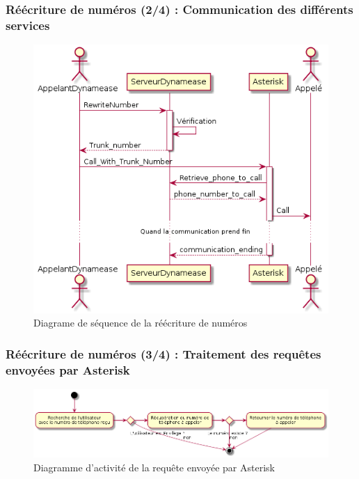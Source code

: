 \begin{frame}
	\frametitle{Réécriture de numéros (2/4) : Communication des différents services}

	\begin{center}
	  \begin{figure}
        \includegraphics[scale=0.30]{images/sequence_rewirte.png}
	   \caption{Diagrame de séquence de la réécriture de numéros}
	  \end{figure}
	\end{center}
\end{frame}

\begin{frame}
	\frametitle{Réécriture de numéros (3/4) : Traitement des requêtes envoyées par Asterisk}

	\begin{center}
	  \begin{figure}
        \includegraphics[scale=0.30]{images/activity_rewrite_ast.png}
	   \caption{Diagramme d'activité de la requête envoyée par Asterisk}
	  \end{figure}
	\end{center}
\end{frame}

